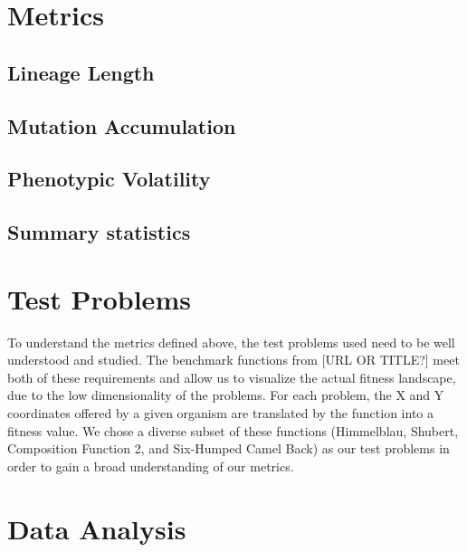\documentclass[letterpaper]{article}
\begin{document}


\section{Metrics}

\subsection{Lineage Length}
\subsection{Mutation Accumulation} 
\subsection{Phenotypic Volatility}

\subsection{Summary statistics}

\section{Test Problems}
To understand the metrics defined above, the test problems used need to be well understood and studied. The benchmark functions from [URL OR TITLE?] meet both of these requirements and allow us to visualize the actual fitness landscape, due to the low dimensionality of the problems. For each problem, the X and Y coordinates offered by a given organism are translated by the function into a fitness value. We chose a diverse subset of these functions (Himmelblau, Shubert, Composition Function 2, and Six-Humped Camel Back) as our test problems in order to gain a broad understanding of our metrics.


\section{Data Analysis}

\end{document}
